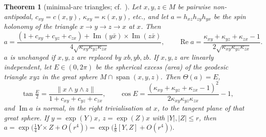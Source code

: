 \documentclass[11pt,reqno]{amsart}
\newtheorem{theorem}{Theorem}[section]
\theoremstyle{definition}
\theoremstyle{remark}
\numberwithin{equation}{section}
\newcommand{\re}{\operatorname{Re}}
\newcommand{\im}{\operatorname{Im}}
\begin{document}
\begin{theorem}[minimal-arc triangles; cf.\ \cite{SB88,MS93}]\label{thm:triangle}
Let $x,y,z\in M$ be pairwise non-antipodal, $c_{xy}=c(x,y)$, $\kappa_{xy}=\kappa(x,y)$, etc., and let
$a=h_{xz}h_{zy}h_{yx}$ be the spin holonomy of the triangle $x\to y\to z\to x$ at $x$.  Then
\begin{equation}\label{eq:tri}
a=\frac{(1+c_{xy}+c_{yz}+c_{zx})+\im(y\bar x)\times\im(z\bar x)}{4\sqrt{\kappa_{xy}\kappa_{yz}\kappa_{zx}}},
\qquad
\re a=\frac{\kappa_{xy}+\kappa_{yz}+\kappa_{zx}-1}{2\sqrt{\kappa_{xy}\kappa_{yz}\kappa_{zx}}} .
\end{equation}
$a$ is unchanged if $x,y,z$ are replaced by $xb,yb,zb$.  If $x,y,z$ are linearly independent, let $E\in(0,2\pi)$
be the spherical excess (area) of the geodesic triangle $xyz$ in the great sphere $M\cap\operatorname{span}(x,y,z)$.
Then $\Theta(a)=E$,
\[
\tan\tfrac E2=\frac{\lVert x\wedge y\wedge z\rVert}{1+c_{xy}+c_{yz}+c_{zx}},\qquad
\cos E=\frac{(\kappa_{xy}+\kappa_{yz}+\kappa_{zx}-1)^2}{2\kappa_{xy}\kappa_{yz}\kappa_{zx}}-1,
\]
and $\im a$ is normal, in the right trivialisation at $x$, to the tangent plane of that great sphere.  If
$y=\exp(Y)x$, $z=\exp(Z)x$ with $\lvert Y\rvert,\lvert Z\rvert\le r$, then
$a=\exp\bigl(\tfrac14Y\times Z+O(r^4)\bigr)=\exp\bigl(\tfrac18[Y,Z]+O(r^4)\bigr)$.
\end{theorem}
\end{document}
